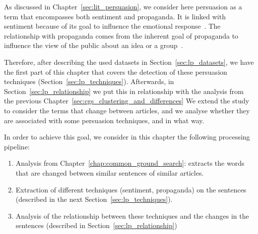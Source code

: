 As discussed in Chapter~\ref{sec:lit_persuasion}, we consider here \gls{persuasion} as a term that encompasses both \gls{sentiment} and \gls{propaganda}. %
It is linked with sentiment because of its goal to influence the emotional response~\citep{gatti2014sentiment,rocklage2018persuasion,petty2015emotion,desteno2004discrete}.
The relationship with propaganda comes from the inherent goal of propaganda to influence the view of the public about an idea or a group~\citep{bernays,jowett2018propaganda}.



Therefore, after describing the used datasets in Section~\ref{sec:lp_datasets}, we have the first part of this chapter that covers the detection of these persuasion techniques (Section~\ref{sec:lp_techniques}).
Afterwards, in Section~\ref{sec:lp_relationship} we put this in relationship with the analysis from the previous Chapter~\ref{sec:cgs_clustering_and_differences} %
We extend the study to consider the terms that change between articles, and we analyse whether they are associated with some persuasion techniques, and in what way. %

In order to achieve this goal, we consider in this chapter the following processing pipeline:
\begin{enumerate}
    \item Analysis from Chapter~\ref{chap:common_ground_search}: extracts the words that are changed between similar sentences of similar articles.
    \item Extraction of different techniques (sentiment, propaganda) on the sentences (described in the next Section~\ref{sec:lp_techniques}). %
    \item Analysis of the relationship between these techniques and the changes in the sentences (described in Section~\ref{sec:lp_relationship})
\end{enumerate}


